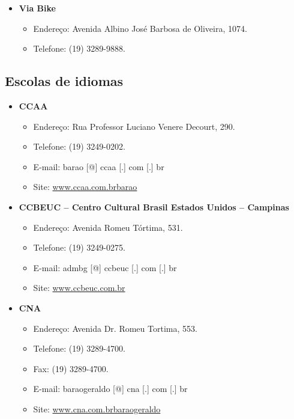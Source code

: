 \begin{itemize}
\item  \textbf{Via Bike}
\begin{itemize}
\item  Endereço: Avenida Albino José Barbosa de Oliveira, 1074.
\item  Telefone: (19) 3289-9888.
\end{itemize}
\end{itemize}

\subsection{Escolas de idiomas}

\begin{itemize}
\item  \textbf{CCAA}
\begin{itemize}
\item  Endereço: Rua Professor Luciano Venere Decourt, 290.
\item  Telefone: (19) 3249-0202.
\item  E-mail: barao [@] ccaa [.] com [.] br
\item  Site: \url{www.ccaa.com.brbarao}
\end{itemize}
\end{itemize}

\begin{itemize}
\item  \textbf{CCBEUC -- Centro Cultural Brasil Estados Unidos -- Campinas}
\begin{itemize}
\item  Endereço: Avenida Romeu Tórtima, 531.
\item  Telefone: (19) 3249-0275.
\item  E-mail: admbg [@] ccbeuc [.] com [.] br
\item  Site: \url{www.ccbeuc.com.br}
\end{itemize}
\end{itemize}

\begin{itemize}
\item  \textbf{CNA}
\begin{itemize}
\item  Endereço: Avenida Dr. Romeu Tortima, 553.
\item  Telefone: (19) 3289-4700.
\item  Fax: (19) 3289-4700.
\item  E-mail: baraogeraldo [@] cna [.] com [.] br
\item  Site: \url{www.cna.com.brbaraogeraldo}
\end{itemize}
\end{itemize}

